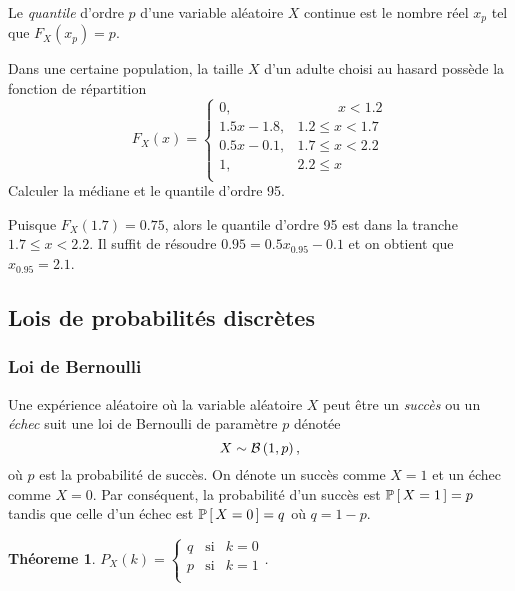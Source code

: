 \documentclass[11pt]{article}
\renewcommand\P[1]{%
	\ensuremath{%
		\mathbb{P}\left[\,#1\,\right]%
	}%
}%
\newcommand\Bin[2]{%
	\ensuremath{%
		\mathcal{B}\left(#1,#2\right)%
	}%
}%
\newtheorem{theoreme}{Théoreme}[section]
\begin{document}
\begin{definition}
	Le \textit{quantile} d'ordre $p$ d'une variable aléatoire $X$ continue est
	le nombre réel $x_p$ tel que $F_X(x_p)=p$.
\end{definition}

\begin{exemple}
	Dans une certaine population, la taille $X$ d'un adulte choisi au hasard
	possède la fonction de répartition 
	\begin{equation*}
		F_X(x)=\left\{
			\begin{matrix}
				0,        & \phantom{1.2\leq\;}x<1.2\\
				1.5x-1.8, & 1.2\leq x<1.7\\
				0.5x-0.1, & 1.7\leq x<2.2\\
				1,        & 2.2\leq x\phantom{<2.2\;}\\
			\end{matrix}
		\right.
	\end{equation*}
	Calculer la médiane et le quantile d'ordre 95.

	Puisque $F_X(1.7)=0.75$, alors le quantile d'ordre 95 est dans la tranche
	$1.7\leq x<2.2$. Il suffit de résoudre $0.95=0.5x_{0.95}-0.1$ et on obtient
	que $x_{0.95}=2.1$.
\end{exemple}

\subsection{Lois de probabilités discrètes}
\subsubsection{Loi de Bernoulli}
Une expérience aléatoire où la variable aléatoire $X$ peut être un
\textit{succès} ou un \textit{échec} suit une loi de Bernoulli de paramètre
$p$ dénotée
\begin{equation*}
	X\sim\Bin{1}{p},
\end{equation*}
où $p$ est la probabilité de succès. On dénote un succès comme $X=1$ et un
échec comme $X=0$. Par conséquent, la probabilité d'un succès est $\P{X=1}=p$
tandis que celle d'un échec est $\P{X=0}=q$ où $q=1-p$.

\begin{theoreme}
	$P_X(k)=\left\{
		\begin{matrix}
			q &\text{si} & k=0\\
			p &\text{si} & k=1\\		
		\end{matrix}
	\right.$.
\end{theoreme}
\end{document}
